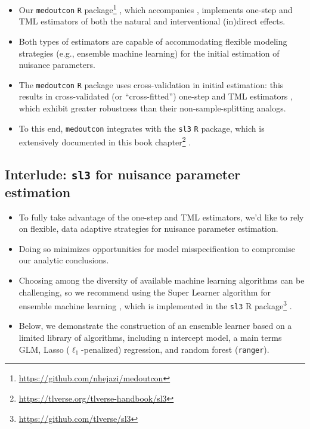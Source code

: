 \documentclass[
  12pt,
]{book}
\newcommand{\passthrough}[1]{#1}
\providecommand{\tightlist}{%
  \setlength{\itemsep}{0pt}\setlength{\parskip}{0pt}}
\renewcommand{\href}[2]{#2\footnote{\url{#1}}}
\theoremstyle{definition}
\theoremstyle{definition}
\theoremstyle{definition}
\newcommand{\1}{\mathbbm{1}}
\begin{document}
\begin{itemize}
\tightlist
\item
  Our \href{https://github.com/nhejazi/medoutcon}{\passthrough{\lstinline!medoutcon!} \passthrough{\lstinline!R!} package}
  \citep{hejazi2021medoutcon}, which accompanies \citet{diaz2020nonparametric}, implements
  one-step and TML estimators of both the natural and interventional (in)direct
  effects.
\item
  Both types of estimators are capable of accommodating flexible modeling
  strategies (e.g., ensemble machine learning) for the initial estimation of
  nuisance parameters.
\item
  The \passthrough{\lstinline!medoutcon!} \passthrough{\lstinline!R!} package uses cross-validation in initial estimation: this
  results in cross-validated (or ``cross-fitted'') one-step and TML estimators
  \citep{klaassen1987consistent, zheng2011cross, chernozhukov2018double}, which
  exhibit greater robustness than their non-sample-splitting analogs.
\item
  To this end, \passthrough{\lstinline!medoutcon!} integrates with the \passthrough{\lstinline!sl3!} \passthrough{\lstinline!R!} package, which is
  extensively documented in this \href{https://tlverse.org/tlverse-handbook/sl3}{book
  chapter} \citep{vdl2022targeted}.
\end{itemize}

\hypertarget{interlude-sl3-for-nuisance-parameter-estimation}{%
\subsection{\texorpdfstring{Interlude: \texttt{sl3} for nuisance parameter estimation}{Interlude: sl3 for nuisance parameter estimation}}\label{interlude-sl3-for-nuisance-parameter-estimation}}

\begin{itemize}
\tightlist
\item
  To fully take advantage of the one-step and TML estimators, we'd like to rely
  on flexible, data adaptive strategies for nuisance parameter estimation.
\item
  Doing so minimizes opportunities for model misspecification to compromise our
  analytic conclusions.
\item
  Choosing among the diversity of available machine learning algorithms can be
  challenging, so we recommend using the Super Learner algorithm for ensemble
  machine learning \citep{vdl2007super}, which is implemented in the \href{https://github.com/tlverse/sl3}{\passthrough{\lstinline!sl3!} R
  package} \citep{coyle2021sl3}.
\item
  Below, we demonstrate the construction of an ensemble learner based on a
  limited library of algorithms, including n intercept model, a main terms GLM,
  Lasso (\(\ell_1\)-penalized) regression, and random forest (\passthrough{\lstinline!ranger!}).
\end{itemize}
\end{document}
